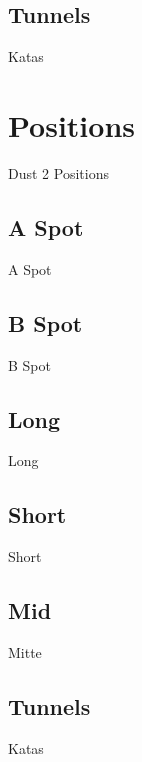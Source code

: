 \subsection{Tunnels}
\label{subsect:dust2_nades_tunnels}
Katas 

\section{Positions}
\label{sect:dust2_positions}
Dust 2 Positions

\subsection{A Spot}
\label{subsect:dust2_positions_A}
A Spot

\subsection{B Spot}
\label{subsect:dust2_positions_B}
B Spot

\subsection{Long}
\label{subsect:dust2_positions_long}
Long

\subsection{Short}
\label{subsect:dust2_positions_short}
Short

\subsection{Mid}
\label{subsect:dust2_positions_mid}
Mitte

\subsection{Tunnels}
\label{subsect:dust2_positions_tunnels}
Katas 